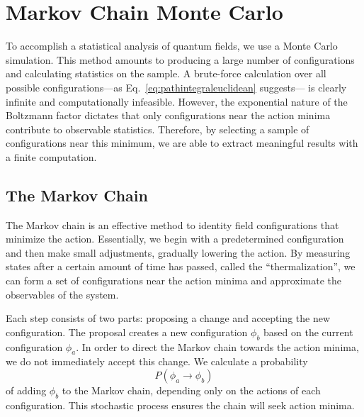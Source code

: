 \section{Markov Chain Monte Carlo}

To accomplish a statistical analysis of quantum fields, we use a Monte Carlo simulation. This method amounts to producing a large number of configurations and calculating statistics on the sample. A brute-force calculation over all possible configurations---as Eq.~\ref{eq:pathintegraleuclidean} suggests--- is clearly infinite and computationally infeasible. However, the exponential nature of the Boltzmann factor dictates that only configurations near the action minima contribute to observable statistics. Therefore, by selecting a sample of configurations near this minimum, we are able to extract meaningful results with a finite computation.

\subsection{The Markov Chain}
The Markov chain is an effective method to identity field configurations that minimize the action. Essentially, we begin with a predetermined configuration and then make small adjustments, gradually lowering the action. By measuring states after a certain amount of time has passed, called the ``thermalization'', we can form a set of configurations near the action minima and approximate the observables of the system. 

Each step consists of two parts: proposing a change and accepting the new configuration. The proposal creates a new configuration $\phi_b$ based on the current configuration $\phi_a$. In order to direct the Markov chain towards the action minima, we do not immediately accept this change. We calculate a probability
\begin{equation}
P(\phi_a \rightarrow \phi_b)
\end{equation}
of adding $\phi_b$ to the Markov chain, depending only on the actions of each configuration. This stochastic process ensures the chain will seek action minima. 

